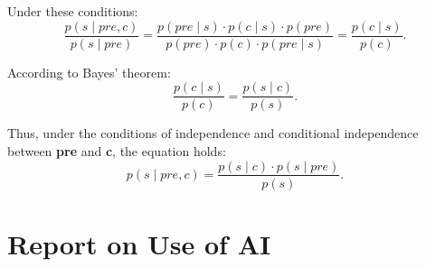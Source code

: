 \documentclass{mcmthesis}
\begin{document}
\begin{appendices}
Under these conditions:
\[
\frac{p(s \mid pre, c)}{p(s \mid pre)} = \frac{p(pre \mid s) \cdot p(c \mid s) \cdot p(pre)}{p(pre) \cdot p(c) \cdot p(pre \mid s)} = \frac{p(c \mid s)}{p(c)}.
\]

According to Bayes' theorem:
\[
\frac{p(c \mid s)}{p(c)} = \frac{p(s \mid c)}{p(s)}.
\]

Thus, under the conditions of independence and conditional independence between \textbf{pre} and \textbf{c}, the equation holds:
\[
p(s \mid pre, c) = \frac{p(s \mid c) \cdot p(s \mid pre)}{p(s)}.
\]

\end{appendices}

\newpage
{}
\setcounter{lastpage}{\value{page}}
\thispagestyle{empty} 

\section*{Report on Use of AI}
\end{document}
